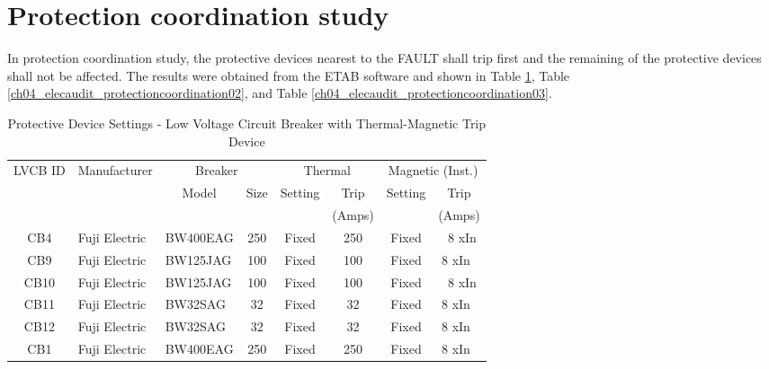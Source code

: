 %
\section{Protection coordination study} \label{ch04_elecaudit_protectioncoordination}
In protection coordination study, the protective devices nearest to the FAULT shall trip first and the remaining of the protective devices shall not be affected. The results were obtained from the ETAB software and shown in Table \ref{ch04_elecaudit_protectioncoordination01}, Table \ref{ch04_elecaudit_protectioncoordination02}, and Table \ref{ch04_elecaudit_protectioncoordination03}.


\begin{table}[!htb]
	\caption{Protective Device Settings - Low Voltage Circuit Breaker with Thermal-Magnetic Trip Device}
	\label{ch04_elecaudit_protectioncoordination01}
	{\scriptsize
		\begin{tabular}{c|c|c|c|c|c|c|c}
			\hline
			LVCB ID & \multicolumn{1}{l|}{Manufacturer} & \multicolumn{2}{c|}{Breaker} & \multicolumn{2}{c|}{Thermal} & \multicolumn{2}{c|}{Magnetic (Inst.)} \\ 
			\cline{3-8}
			& \multicolumn{1}{l|}{} & Model & Size & Setting & Trip & Setting & Trip \\ 
			& \multicolumn{1}{l|}{} &  &  &  & (Amps) &  & (Amps) \\ 
			\hline
			CB4 & \multicolumn{1}{l|}{Fuji Electric} & \multicolumn{1}{l|}{BW400EAG} & 250 & Fixed & 250 & Fixed &  8 xIn \\ 
			CB9 & \multicolumn{1}{l|}{Fuji Electric} & \multicolumn{1}{l|}{BW125JAG} & 100 & Fixed & 100 & Fixed & 8 xIn  \\ 
			CB10 & \multicolumn{1}{l|}{Fuji Electric} & \multicolumn{1}{l|}{BW125JAG} & 100 & Fixed & 100 & Fixed &  8 xIn \\ 
			CB11 & \multicolumn{1}{l|}{Fuji Electric} & \multicolumn{1}{l|}{BW32SAG} & 32 & Fixed & 32 & Fixed & 8 xIn  \\ 
			CB12 & \multicolumn{1}{l|}{Fuji Electric} & \multicolumn{1}{l|}{BW32SAG} & 32 & Fixed & 32 & Fixed & 8 xIn  \\ 
			CB1 & \multicolumn{1}{l|}{Fuji Electric} & \multicolumn{1}{l|}{BW400EAG} & 250 & Fixed & 250 & Fixed & 8 xIn  \\ 
			\hline
		\end{tabular}
		
	}%
\end{table}



